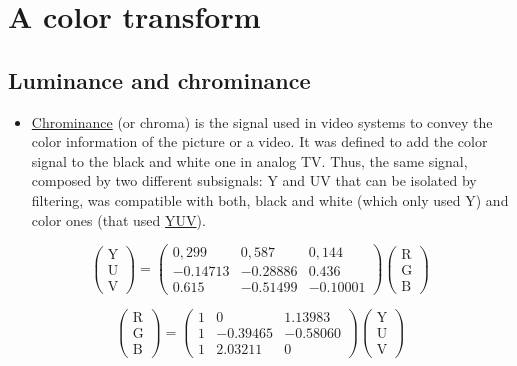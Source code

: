 \section{A color transform}
\subsection{Luminance and chrominance}
\begin{itemize}
\tightlist
\item
  \href{https://en.wikipedia.org/wiki/Chrominance}{Chrominance} (or
  chroma) is the signal used in video systems to convey the color
  information of the picture or a video. It was defined to add the color
  signal to the black and white one in analog TV. Thus, the same signal,
  composed by two different subsignals: Y and UV that can be isolated by
  filtering, was compatible with both, black and white (which only used
  Y) and color ones (that used
  \href{https://en.wikipedia.org/wiki/YUV}{YUV}).
\end{itemize}

\begin{equation}
    \left(
      \begin{array}{c}
        \text{Y}\\
        \text{U}\\
        \text{V}
      \end{array}
    \right) =
    \left(
      \begin{array}{rrr}
          0,299 & 0,587 & 0,144 \\
          -0.14713 & -0.28886 &  0.436 \\
          0.615   & -0.51499 & -0.10001
      \end{array}
    \right)
    \left(
      \begin{array}{c}
        \text{R}\\
        \text{G}\\
        \text{B}
      \end{array}
    \right)
\end{equation}

\begin{equation}
    \left(
      \begin{array}{c}
        \text{R}\\
        \text{G}\\
        \text{B}
      \end{array}
    \right) =
    \left(
      \begin{array}{rrr}
          1 &  0       &  1.13983 \\
          1 & -0.39465 & -0.58060 \\
          1 &  2.03211 &  0
      \end{array}
    \right)
    \left(
      \begin{array}{c}
        \text{Y}\\
        \text{U}\\
        \text{V}
      \end{array}
    \right)
\end{equation}

